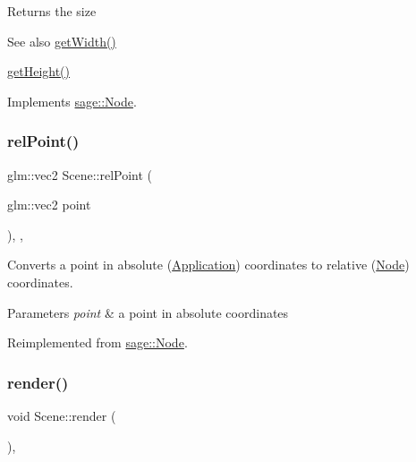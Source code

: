 \begin{DoxyReturn}{Returns}
the size 
\end{DoxyReturn}
\begin{DoxySeeAlso}{See also}
\mbox{\hyperlink{classsage_1_1Node_a65163ffabcfe9f482282ea37ead6fc5f}{get\+Width()}} 

\mbox{\hyperlink{classsage_1_1Node_a6af5a8378ac8d2c3490adbc2a03f1247}{get\+Height()}} 
\end{DoxySeeAlso}


Implements \mbox{\hyperlink{classsage_1_1Node_a286d3b5b0d16d31991b58cab972fb03b}{sage\+::\+Node}}.

\mbox{\label{classsage_1_1Scene_aa8b5a43db8e18dc3ec8695ca465a1308}} 
\subsubsection{\texorpdfstring{relPoint()}{relPoint()}}
{\footnotesize\ttfamily glm\+::vec2 Scene\+::rel\+Point (\begin{DoxyParamCaption}\item[{glm\+::vec2}]{point }\end{DoxyParamCaption})\hspace{0.3cm}{\ttfamily [override]}, {\ttfamily [protected]}, {\ttfamily [virtual]}}



Converts a point in absolute (\mbox{\hyperlink{classsage_1_1Application}{Application}}) coordinates to relative (\mbox{\hyperlink{classsage_1_1Node}{Node}}) coordinates. 


\begin{DoxyParams}{Parameters}
{\em point} & a point in absolute coordinates \\
\hline
\end{DoxyParams}


Reimplemented from \mbox{\hyperlink{classsage_1_1Node_a602f53d66ee202b54ae71b9a53057173}{sage\+::\+Node}}.

\mbox{\label{classsage_1_1Scene_a5179bf540ba57931b65668b5b42af10f}} 
\subsubsection{\texorpdfstring{render()}{render()}}
{\footnotesize\ttfamily void Scene\+::render (\begin{DoxyParamCaption}{ }\end{DoxyParamCaption})\hspace{0.3cm}{\ttfamily [override]}, {\ttfamily [virtual]}}



